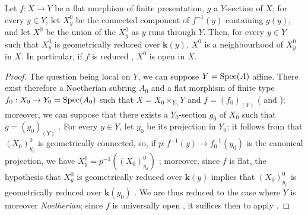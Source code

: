 \begin{corollary}[15.6.5]
\label{IV.15.6.5}
Let $f:X\to Y$ be a flat morphism of finite presentation, $g$ a $Y$-section of $X$; for every $y\in Y$, let $X_y^0$ be the connected component of $f^{-1}(y)$ containing $g(y)$, and let $X^0$ be the union of the $X_y^0$ as $y$ runs through $Y$.
Then, for every $y\in Y$ such that $X_y^0$ is geometrically reduced over $\boldsymbol{k}(y)$, $X^0$ is a neighbourhood of $X_y^0$ in $X$.
In particular, if $f$ is reduced , $X^0$ is open in $X$.
\end{corollary}

\begin{proof}
The question being local on $Y$, we can suppose $Y=\operatorname{Spec}(A)$ affine.
There exist therefore a Noetherian subring $A_0$ and a flat morphism of finite type $f_0:X_0\to Y_0=\operatorname{Spec}(A_0)$ such that $X=X_0\times_{Y_0}Y$ and $f=(f_0)_{(Y)}$ ( and ); moreover, we can suppose that there exists a $Y_0$-section $g_0$ of $X_0$ such that $g=(g_0)_{(Y)}$ .
For every $y\in Y$, let $y_0$ be its projection in $Y_0$; it follows from  that $(X_0)_{y_0}^0$ is geometrically connected, so, if $p:f^{-1}(y)\to f_0^{-1}(y_0)$ is the canonical projection, we have $X_y^0=p^{-1}((X_0)_{y_0}^0)$ ; moreover, since $f$ is flat, the hypothesis that $X_y^0$ is geometrically reduced over $\boldsymbol{k}(y)$ implies that $(X_0)_{y_0}^0$ is geometrically reduced over $\boldsymbol{k}(y_0)$ .
We are thus reduced to the case where
$Y$ is moreover \emph{Noetherian}; since $f$ is universally open , it suffices then to apply .
\end{proof}

